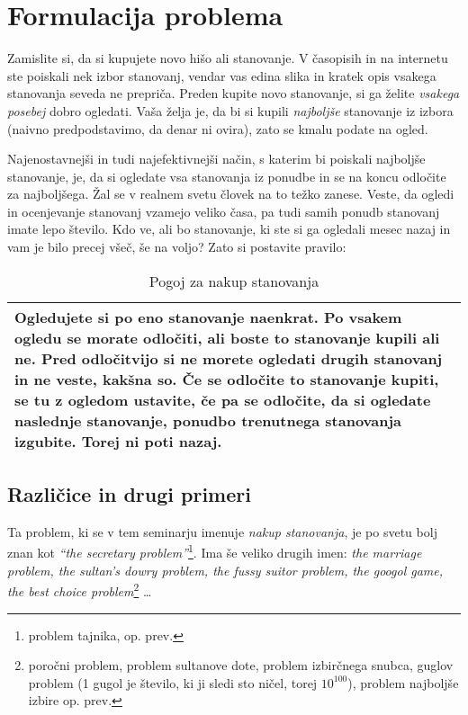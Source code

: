\documentclass[a4paper, 12pt, titlepage]{article}
\begin{document}
\newpage
\section{Formulacija problema}

Zamislite si, da si kupujete novo hišo ali stanovanje. V časopisih in na internetu ste poiskali nek izbor stanovanj, vendar vas edina slika in kratek opis vsakega stanovanja seveda ne prepriča. Preden kupite novo stanovanje, si ga želite \emph{vsakega posebej} dobro ogledati. Vaša želja je, da bi si kupili \emph{najboljše} stanovanje iz izbora (naivno predpodstavimo, da denar ni ovira), zato se kmalu podate na ogled.

Najenostavnejši in tudi najefektivnejši način, s katerim bi poiskali najboljše stanovanje, je, da si ogledate vsa stanovanja iz ponudbe in se na koncu odločite za najboljšega. Žal se v realnem svetu človek na to težko zanese. Veste, da ogledi in ocenjevanje stanovanj vzamejo veliko časa, pa tudi samih ponudb stanovanj imate lepo število. Kdo ve, ali bo stanovanje, ki ste si ga ogledali mesec nazaj in vam je bilo precej všeč, še na voljo? Zato si postavite pravilo:

\begin{table}[h]
    \begin{tabular}{|p{13cm}|}
        \hline
Ogledujete si po eno stanovanje naenkrat. \textbf{Po vsakem ogledu se morate odločiti, ali boste to stanovanje kupili ali ne.} Pred odločitvijo si ne morete ogledati drugih stanovanj in ne veste, kakšna so. Če se odločite to stanovanje kupiti, se tu z ogledom ustavite, če pa se odločite, da si ogledate naslednje stanovanje, ponudbo trenutnega stanovanja izgubite. Torej \textbf{ni poti nazaj.}\\
        \hline
    \end{tabular}
    \caption{Pogoj za nakup stanovanja}
    \label{pogoj_za_nakup}
\end{table}


\subsection{Različice in drugi primeri}

Ta problem, ki se v tem seminarju imenuje \emph{nakup stanovanja}, je po svetu bolj znan kot \emph{``the secretary problem''}\footnote{problem tajnika, op. prev.}. Ima še veliko drugih imen: \emph{the marriage problem, the sultan's dowry problem, the fussy suitor problem, the googol game, the best choice problem}\footnote{poročni problem, problem sultanove dote, problem izbirčnega snubca, guglov problem (1 gugol je število, ki ji sledi sto ničel, torej $10^{100}$), problem najboljše izbire op. prev.} \ldots
\end{document}
